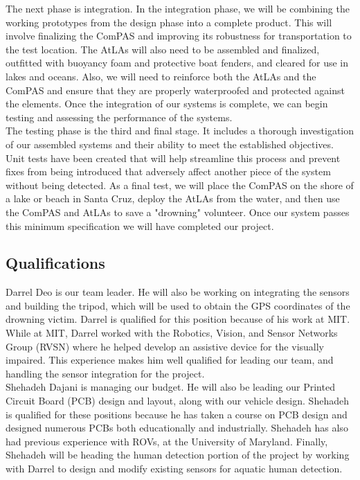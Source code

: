 \documentclass[11pt]{article}
\begin{document}
The next phase is integration. In the integration phase, we will be combining the working prototypes from the design phase into a complete product. This will involve finalizing the ComPAS and improving its robustness for transportation to the test location. The AtLAs will also need to be assembled and finalized, outfitted with buoyancy foam and protective boat fenders, and cleared for use in lakes and oceans. Also, we will need to reinforce both the AtLAs and the ComPAS and ensure that they are properly waterproofed and protected against the elements. Once the integration of our systems is complete, we can begin testing and assessing the performance of the systems.\\

The testing phase is the third and final stage. It includes a thorough investigation of our assembled systems and their ability to meet the established objectives. Unit tests have been created that will help streamline this process and prevent fixes from being introduced that adversely affect another piece of the system without being detected. As a final test, we will place the ComPAS on the shore of a lake or beach in Santa Cruz, deploy the AtLAs from the water, and then use the ComPAS and AtLAs to save a "drowning" volunteer. Once our system passes this minimum specification we will have completed our project.

\subsection*{Qualifications}

Darrel Deo is our team leader. He will also be working on integrating the sensors and building the tripod, which will be used to obtain the GPS coordinates of the drowning victim. Darrel is qualified for this position because of his work at MIT. While at MIT, Darrel worked with the Robotics, Vision, and Sensor Networks Group (RVSN) where he helped develop an assistive device for the visually impaired. This experience makes him well qualified for leading our team, and handling the sensor integration for the project.\\

Shehadeh Dajani is managing our budget. He will also be leading our Printed Circuit Board (PCB) design and layout, along with our vehicle design. Shehadeh is qualified for these positions because he has taken a course on PCB design and designed numerous PCBs both educationally and industrially. Shehadeh has also had previous experience with ROVs, at the University of Maryland. Finally, Shehadeh will be heading the human detection portion of the project by working with Darrel to design and modify existing sensors for aquatic human detection.\\
\end{document}
